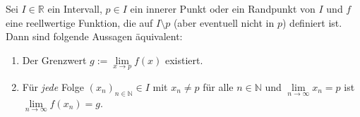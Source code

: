 Sei $I \in \mathbb{R}$ ein Intervall, $p \in I$ ein innerer Punkt oder ein Randpunkt von $I$ und $f$ eine reellwertige Funktion, die auf $I \setminus {p}$ (aber eventuell nicht in $p$) definiert ist. Dann sind folgende Aussagen äquivalent:
\begin{enumerate}
    \item Der Grenzwert $g := \lim\limits_{x \to p} f(x)$ existiert.
    \item Für \textit{jede} Folge $(x_n)_{n \in \mathbb{N}} \in I$ mit $x_n \neq p$ für alle $n \in \mathbb{N}$ und $\lim\limits_{n \to \infty} x_n = p$ ist $\lim\limits_{n \to \infty} f(x_n) = g$.
\end{enumerate}